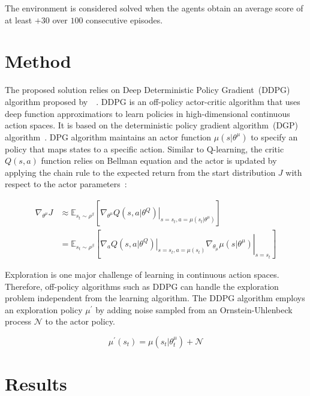 \documentclass[12pt,english]{article}
\begin{document}
The environment is considered solved when the agents obtain an average score of at least \(+30\) over \(100\) consecutive episodes.

\section{Method}

The proposed solution relies on Deep Deterministic Policy Gradient~(DDPG) algorithm proposed by~\citeauthor{lillicrap:16}~\cite{lillicrap:16}. DDPG is an off-policy actor-critic algorithm that uses deep function approximatiors to learn policies in high-dimensional continuous action spaces. It is based on the deterministic policy gradient algorithm~(DGP) algorithm~\citeauthor{silver:14}. DPG algorithm maintains an actor function \(\mu(s|\theta^\mu)\) to specify an policy that maps states to a specific action. Similar to Q-learning, the critic \(Q(s,a)\) function relies on Bellman equation and the actor is updated by applying the chain rule to the expected return from the start distribution \(J\) with respect to the actor parameters~\cite{lillicrap:16}:

\begin{equation*}
   \begin{aligned}
      \nabla_{\theta^{\mu}} J & \approx \mathbb{E}_{s_{t} \sim \rho^{\beta}}\left[\left.\nabla_{\theta^{\mu}} Q\left(s, a | \theta^{Q}\right)\right|_{s=s_{t}, a=\mu\left(s_{t} | \theta^{\mu}\right)}\right] \\&=\mathbb{E}_{s_{t} \sim \rho^{\beta}}\left[\left.\left.\nabla_{a} Q\left(s, a | \theta^{Q}\right)\right|_{s=s_{t}, a=\mu\left(s_{t}\right)} \nabla_{\theta_{\mu}} \mu\left(s | \theta^{\mu}\right)\right|_{s=s_{t}}\right]
   \end{aligned}
\end{equation*}

Exploration is one major challenge of learning in continuous action spaces. Therefore, off-policy algorithms such as DDPG can handle the exploration problem independent from the learning algorithm. The DDPG algorithm employs an exploration policy \(\mu^\prime\) by adding noise sampled from an Ornstein-Uhlenbeck process \(\mathcal{N}\) to the actor policy. 

\begin{equation*}
\mu^{\prime}\left(s_{t}\right)=\mu\left(s_{t} | \theta_{t}^{\mu}\right)+\mathcal{N}
\end{equation*}

\section{Results}
\end{document}
